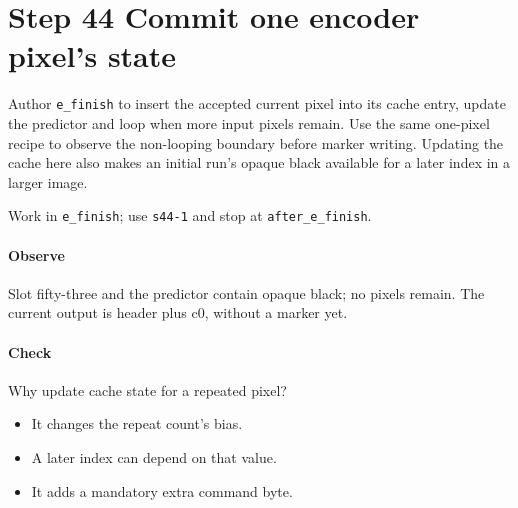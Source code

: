 \section{Step 44 Commit one encoder pixel’s state}\label{qoi-s44}
Author \texttt{e\_finish} to insert the accepted current pixel into its cache entry, update the predictor and loop when more input pixels remain. Use the same one-pixel recipe to observe the non-looping boundary before marker writing. Updating the cache here also makes an initial run’s opaque black available for a later index in a larger image.

Work in \texttt{e\_finish}; use \texttt{s44-1} and stop at \texttt{after\_e\_finish}.

\paragraph{Observe} Slot fifty-three and the predictor contain opaque black; no pixels remain. The current output is header plus c0, without a marker yet.

\paragraph{Check} Why update cache state for a repeated pixel?
\begin{itemize}
\item[A.] It changes the repeat count’s bias.
\item[B.] A later index can depend on that value.
\item[C.] It adds a mandatory extra command byte.
\end{itemize}
